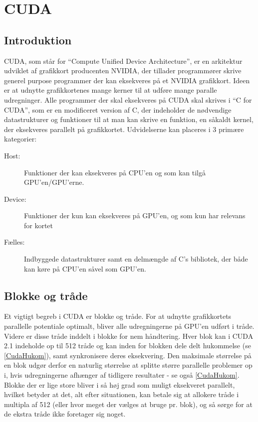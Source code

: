 
\section{CUDA}
\label{CUDA}
\subsection{Introduktion}

CUDA, som står for ``Compute Unified Device Architecture'', er en arkitektur udviklet af grafikkort producenten NVIDIA, der tillader programmører skrive generel purpose programmer der kan eksekveres på et NVIDIA grafikkort. Ideen er at udnytte grafikkortenes mange kerner til at udføre mange paralle udregninger. Alle programmer der skal eksekveres på CUDA skal skrives i ``C for CUDA'', som er en modificeret version af C, der indeholder de nødvendige datastrukturer og funktioner til at man kan skrive en funktion, en såkaldt kernel, der eksekveres parallelt på grafikkortet. Udvidelserne kan placeres i 3 primære kategorier:

\begin{description}
\item[Host:] Funktioner der kan eksekveres på CPU'en og som kan tilgå GPU'en/GPU'erne.
\item[Device:] Funktioner der kun kan eksekveres på GPU'en, og som kun har relevans for kortet
\item[Fælles:] Indbyggede datastrukturer samt en delmængde af C's bibliotek, der både kan køre på CPU'en såvel som GPU'en.
\end{description}


\subsection{Blokke og tråde}

Et vigtigt begreb i CUDA er blokke og tråde. For at udnytte grafikkortets parallelle potentiale optimalt, bliver alle udregningerne på GPU'en udført i tråde. Videre er disse tråde inddelt i blokke for nem håndtering. Hver blok kan i CUDA 2.1 indeholde op til 512 tråde og kan inden for blokken dele delt hukommelse (se \ref{CudaHukom}), samt synkronisere deres eksekvering. Den maksimale størrelse på en blok udgør derfor en naturlig størrelse at splitte større parallelle problemer op i, hvis udregningerne afhænger af tidligere resultater - se også \ref{CudaHukom}. Blokke der er lige store bliver i så høj grad som muligt eksekveret parallelt, hvilket betyder at det, alt efter situationen, kan betale sig at allokere tråde i multipla af 512 (eller hvor meget der vælges at bruge pr. blok), og så sørge for at de ekstra tråde ikke foretager sig noget.

